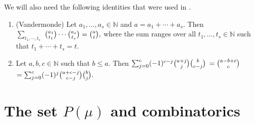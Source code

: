 We will also need the following identities that were used in \cite{MS3}. 
\begin{lemma}\label{bin2} \;\begin{enumerate}
		
		\item \textup{(Vandermonde)} Let $a_1, \dots, a_s \in \mathbb{N}$ and $a=a_1+\cdots+a_s$. Then \\$\sum_{t_1,\cdots,t_s}$ $\tbinom{a_1}{ t_1}\cdots \tbinom{a_s}{t_s}=\tbinom{a}{t},$
			where the sum ranges over all $t_1,\dots,t_s \in \mathbb{N} $ such that $t_1+\cdots+t_s = t.$
		\item Let $a,b,c \in \mathbb{N}$  such that $ b \le a$. Then
		$\sum_{j=0}^{c}(-1)^{c-j}\tbinom{a+j}{j}\tbinom{b}{c-j}$ $=\tbinom{a-b+c}{c}$ $= \sum_{j=0}^{c}(-1)^{j}\tbinom{a+c-j}{c-j}\tbinom{b}{j}.$
	\end{enumerate}
\end{lemma}

\section{The set \texorpdfstring{$P(\mu)$}{P(mu)} and combinatorics}
	

